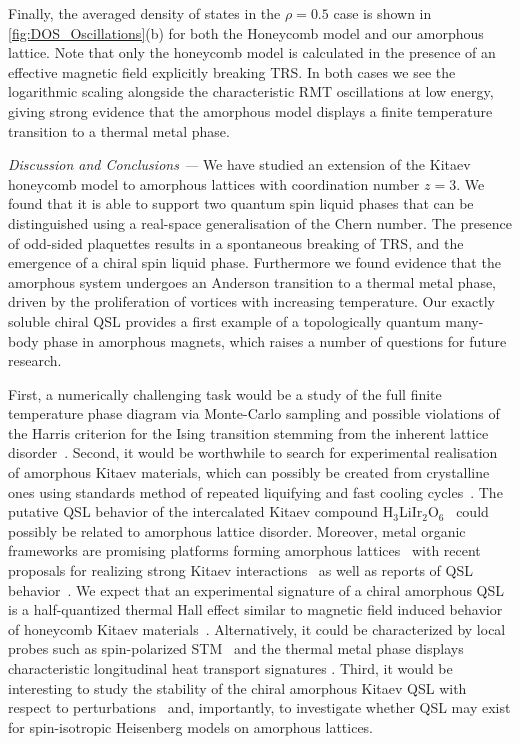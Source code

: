 \documentclass[%
 reprint,
superscriptaddress,
 amsmath,amssymb,
aps,
]{revtex4-2}
\begin{document}
Finally, the averaged density of states in the $\rho = 0.5$ case is shown in \cref{fig:DOS_Oscillations}(b) for both the Honeycomb model and our amorphous lattice. Note that only the honeycomb model is calculated in the presence of an effective magnetic field explicitly breaking TRS. In both cases we see the logarithmic scaling alongside the characteristic RMT oscillations at low energy, giving strong evidence that the amorphous model displays a finite temperature transition to a thermal metal phase. 


{\it Discussion and Conclusions ---}
We have studied an extension of the Kitaev honeycomb model to amorphous lattices with coordination number $z= 3$. We found that it is able to support two quantum spin liquid phases that can be distinguished using a real-space generalisation of the Chern number. The presence of odd-sided plaquettes results in a spontaneous breaking of TRS, and the emergence of a chiral spin liquid phase. Furthermore we found evidence that the amorphous system undergoes an Anderson transition to a thermal metal phase, driven by the proliferation of vortices with increasing temperature. 
Our exactly soluble chiral QSL provides a first example of a topologically quantum many-body phase in amorphous magnets, which raises a number of questions for future research. 

First, a numerically challenging task would be a study of the full finite temperature phase diagram via Monte-Carlo sampling and possible violations of the Harris criterion for the Ising transition stemming from the inherent lattice disorder~\cite{barghathi2014phase,schrauth2018two,schrauth2018violation}. Second, it would be worthwhile to search for experimental realisation of amorphous Kitaev materials, which can possibly be created from crystalline ones using standards method of repeated liquifying and fast cooling cycles~\cite{Weaire1976,Petrakovski1981,Kaneyoshi2018}. The putative QSL behavior of the intercalated Kitaev compound H$_3$LiIr$_2$O$_6$~\cite{kitagawa2018spin,knolle2019bond} could possibly be related to amorphous lattice disorder. Moreover, metal organic frameworks are promising platforms forming amorphous lattices~\cite{bennett2014amorphous} with recent proposals for realizing strong Kitaev interactions~\cite{yamada2017designing} as well as reports of QSL behavior~\cite{misumi2020quantum}. We expect that an experimental signature of a chiral amorphous QSL is a half-quantized thermal Hall effect similar to magnetic field induced behavior of honeycomb Kitaev materials~\cite{Kasahara2018,Yokoi2021,Yamashita2020,Bruin2022}. Alternatively, it could be characterized by local probes such as spin-polarized STM~\cite{Feldmeier2020,Konig2020,Udagawa2021} and the thermal metal phase displays characteristic longitudinal heat transport signatures \cite{Beenakker2013}. Third, it would be interesting to study the stability of the chiral amorphous Kitaev QSL with respect to perturbations~\cite{Rau2014,Chaloupka2010,Chaloupka2013,Chaloupka2015,Winter2016} and, importantly, to investigate whether QSL may exist for spin-isotropic Heisenberg models on amorphous lattices. 
\end{document}
